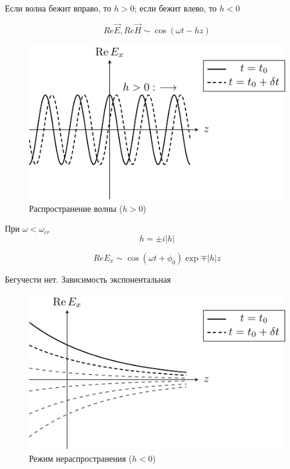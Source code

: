 Если волна бежит вправо, то $h > 0$; если бежит влево, то $h < 0$

\begin{equation*}
Re{\vec{E}} , Re{\vec{H}} \sim \cos(\omega t - h z)
\end{equation*}

\begin{figure}[h!]
\centering
\includegraphics[scale=1]{img/lect3_ris1}
\caption{Распространение волны ($h>0$)}
\label{fig:lect3:1}
\end{figure}
При $\omega < \omega_{cr}$
\begin{equation*}
h = \pm i |h|
\end{equation*}

\begin{equation*}
Re{E_x} \sim \cos(\omega t + \phi_0) \exp{\mp |h| z}
\end{equation*}

Бегучести нет.
Зависимость экспонентальная
\begin{figure}[h!]
\centering
\includegraphics[scale=1]{img/lect3_ris2}
\caption{Режим нераспространения ($h<0$)}
\label{fig:lect3:2}
\end{figure}

